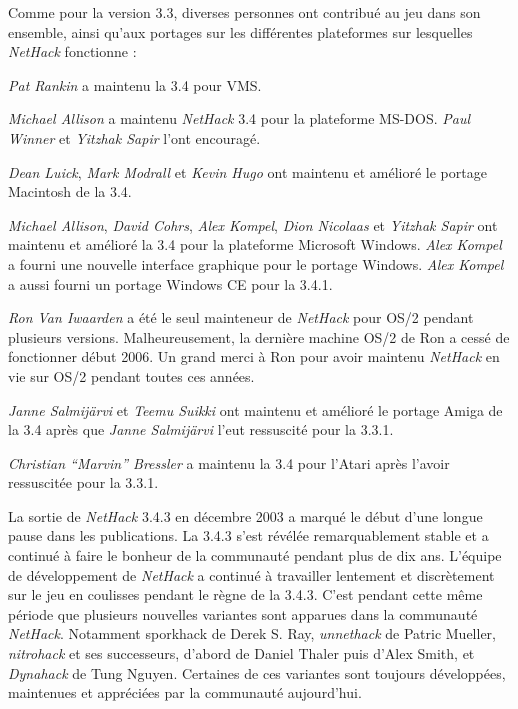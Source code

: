 \documentclass[titlepage]{article}
\begin{document}
\medskip
Comme pour la version 3.3, diverses personnes ont contribué au jeu dans son ensemble,
ainsi qu'aux portages sur les différentes plateformes sur lesquelles \textit{NetHack}
fonctionne :

\medskip
\noindent\textit{Pat Rankin} a maintenu la 3.4 pour VMS.

\medskip
\noindent \textit{Michael Allison} a maintenu \textit{NetHack} 3.4 pour la plateforme
MS-DOS.
\textit{Paul Winner} et \textit{Yitzhak Sapir} l'ont encouragé.

\medskip
\noindent \textit{Dean Luick}, \textit{Mark Modrall} et \textit{Kevin Hugo} ont maintenu et
amélioré le portage Macintosh de la 3.4.

\medskip
\noindent \textit{Michael Allison}, \textit{David Cohrs}, \textit{Alex Kompel},
\textit{Dion Nicolaas} et
\textit{Yitzhak Sapir} ont maintenu et amélioré la 3.4 pour la plateforme
Microsoft Windows.
\textit{Alex Kompel} a fourni une nouvelle interface graphique pour le portage Windows.
\textit{Alex Kompel} a aussi fourni un portage Windows CE pour la 3.4.1.

\medskip
\noindent \textit{Ron Van Iwaarden} a été le seul mainteneur de \textit{NetHack} pour
OS/2 pendant
plusieurs versions. Malheureusement, la dernière machine OS/2 de Ron a cessé de fonctionner
début 2006. Un grand merci à Ron pour avoir maintenu \textit{NetHack} en vie sur
OS/2 pendant toutes ces années.

\medskip
\noindent \textit{Janne Salmij\"{a}rvi} et \textit{Teemu Suikki} ont maintenu
et amélioré le portage Amiga de la 3.4 après que \textit{Janne Salmij\"{a}rvi} l'eut ressuscité
pour la 3.3.1.

\medskip
\noindent \textit{Christian ``Marvin'' Bressler} a maintenu la 3.4 pour l'Atari après l'avoir
ressuscitée pour la 3.3.1.

\medskip
La sortie de \textit{NetHack} 3.4.3 en décembre 2003 a marqué le début d'une
longue pause dans les publications. La 3.4.3 s'est révélée remarquablement stable et
a continué à faire le bonheur de la communauté pendant plus de dix ans.
L'équipe de développement de \textit{NetHack} a continué à travailler lentement et discrètement sur le jeu en coulisses
pendant le règne de la 3.4.3. C'est pendant cette même période que plusieurs
nouvelles variantes sont apparues dans la communauté \textit{NetHack}. Notamment sporkhack de
Derek S. Ray, \textit{unnethack} de Patric Mueller, \textit{nitrohack} et ses
successeurs, d'abord de Daniel Thaler puis d'Alex Smith, et
\textit{Dynahack} de Tung Nguyen.
Certaines de ces variantes sont toujours
développées, maintenues et appréciées par la communauté aujourd'hui.
\end{document}
